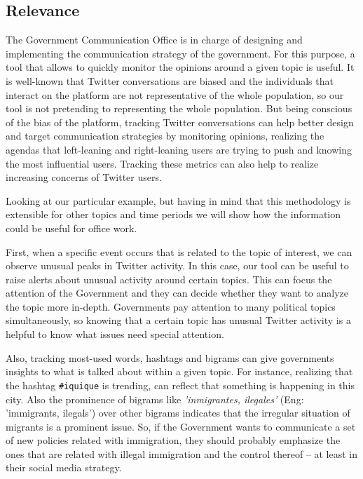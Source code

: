  \subsection{Relevance}
    
    The Government Communication Office is in charge of designing and implementing the communication strategy of the government. For this purpose, a tool that allows to quickly monitor the opinions around a given topic is useful. It is well-known that Twitter conversations are biased and the individuals that interact on the platform are not representative of the whole population, so our tool is not pretending to representing the whole population. But being conscious of the bias of the platform, tracking Twitter conversations can help better design and target communication strategies by monitoring opinions, realizing the agendas that left-leaning and right-leaning users are trying to push and knowing the most influential users. Tracking these metrics can also help to realize increasing concerns of  Twitter users.
    
    
    
    Looking at our particular example, but having in mind that this methodology is extensible for other topics and time periods we will show how the information could be useful for office work.
    
    First, when a specific event occurs that is related to the topic of interest, we can observe unusual peaks in Twitter activity. In this case, our tool can be useful to raise alerts about unusual activity around certain topics. This can focus the attention of the Government and they can decide whether they want to analyze the topic more in-depth. Governments pay attention to many political topics simultaneously, so knowing that a certain topic has unusual Twitter activity is a helpful to know what issues need special attention. 
    
    Also, tracking most-used words, hashtags and bigrams can give governments insights to what is talked about within a given topic. For instance, realizing that the hashtag \texttt{\#iquique} is trending, can reflect that something is happening in this city. Also the prominence of bigrams like {\it 'inmigrantes, ilegales'} (Eng: 'immigrants, ilegals') over other bigrams indicates that the irregular situation of migrants is a prominent issue. So, if the Government wants to communicate a set of new policies related with immigration, they should probably emphasize the ones that are related with illegal immigration and the control thereof -- at least in their social media strategy.
    
